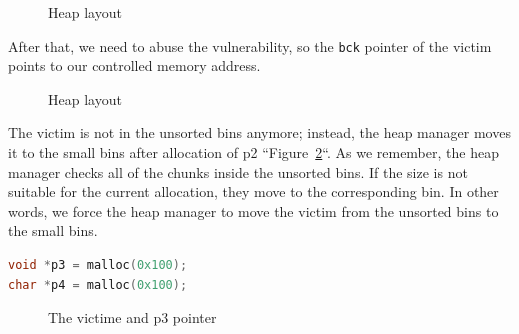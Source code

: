\documentclass{masterthesis}
\newcommand*\ub{unsorted bins}
\newcommand*\sbs{small bins}
\begin{document}
\begin{figure}[h!]
 \caption{Heap layout}
 \label{fig:gdb2}
\end{figure}
After that, we need to abuse the vulnerability, so the \lstinline{bck} pointer of the victim points to our controlled memory address.
\begin{figure}[h!]
 \caption{Heap layout}
 \label{fig:gdb3}
\end{figure}
The victim is not in the \ub{} anymore; instead, the heap manager moves it to the \sbs{} after allocation of p2 ``Figure~\ref{fig:gdb3}``. As we remember, the heap manager checks all of the chunks inside the \ub{}. If the size is not suitable for the current allocation, they move to the corresponding bin. In other words, we force the heap manager to move the victim from the \ub{} to the \sbs{}.

\begin{lstlisting}[language=c,frame=tlrb]
void *p3 = malloc(0x100);
char *p4 = malloc(0x100);
\end{lstlisting}

\begin{figure}[h!]
\caption{The victime and p3 pointer}
\label{fig:gdb4}
\end{figure}
\end{document}
